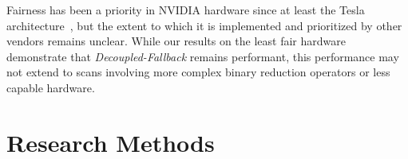\documentclass[sigconf]{acmart}
\begin{document}
Fairness has been a priority in NVIDIA hardware since at least the Tesla architecture~\cite{}, but the extent to which it is implemented and prioritized by other vendors remains unclear. While our results on the least fair hardware demonstrate that \emph{Decoupled-Fallback} remains performant, this performance may not extend to scans involving more complex binary reduction operators or less capable hardware.
\begin{acks}
\end{acks}




\appendix

\section{Research Methods}
\end{document}
